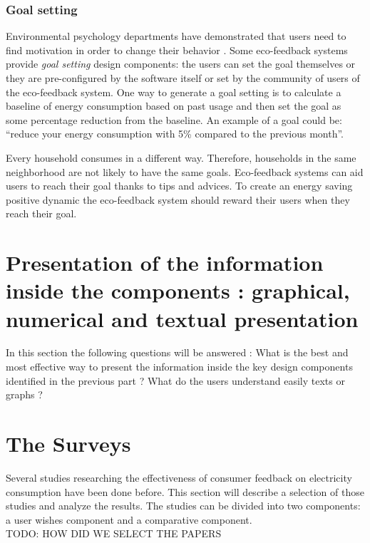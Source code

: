 \documentclass[journal]{vgtc}                %
\begin{document}
\subsubsection{Goal setting}
Environmental psychology departments have demonstrated that users need to find motivation in order to change their behavior \cite{abrahamse2007effect}.
Some eco-feedback systems provide \textit{goal setting} design components: the users can set the goal themselves or they are pre-configured by the software itself or set by the community of users of the eco-feedback system.  %
One way to generate a goal setting is to calculate a baseline of energy consumption based on past usage and then set the goal as some percentage reduction from the baseline. %
An example of a goal could be: ``reduce your energy consumption with 5\% compared to the previous month''.

Every household consumes in a different way. Therefore, households in the same neighborhood are not likely to have the same goals.
Eco-feedback systems can aid users to reach their goal thanks to tips and advices.
To create an energy saving positive dynamic the eco-feedback system should reward their users when they reach their goal. 



\section{Presentation of the information inside the components : graphical, numerical and textual presentation} %
In this section the following questions will be answered : What is the best and most effective way to present the information inside the key design components identified in the previous part ? What do the users understand easily texts or graphs ?

\section{The Surveys}
Several studies researching the effectiveness of consumer feedback on electricity consumption have been done before.
This section will describe a selection of those studies and analyze the results.
The studies can be divided into two components: a user wishes component and a comparative component.
 \\
 TODO: HOW DID WE SELECT THE PAPERS
\end{document}
